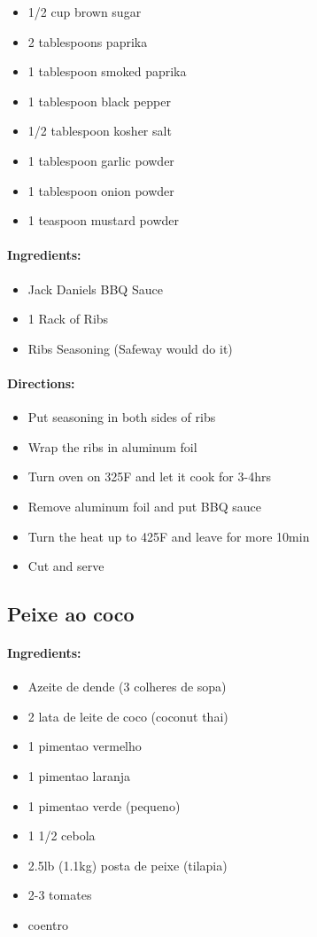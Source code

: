 \documentclass{article}
\begin{document}
\begin{itemize}
\item 1/2 cup brown sugar
\item 2 tablespoons paprika
\item 1 tablespoon smoked paprika
\item 1 tablespoon black pepper
\item 1/2 tablespoon kosher salt
\item 1 tablespoon garlic powder
\item 1 tablespoon onion powder
\item 1 teaspoon mustard powder
\end{itemize}

\paragraph{Ingredients:}

\begin{itemize}
\item Jack Daniels BBQ Sauce 
\item 1 Rack of Ribs 
\item Ribs Seasoning (Safeway would do it)
\end{itemize}

\paragraph{Directions:}
\begin{itemize}
\item Put seasoning in both sides of ribs 
\item Wrap the ribs in aluminum foil 
\item Turn oven on 325F and let it cook for 3-4hrs 
\item Remove aluminum foil and put BBQ sauce 
\item Turn the heat up to 425F and leave for more 10min 
\item Cut and serve
\end{itemize}

\subsection{Peixe ao coco}

\paragraph{Ingredients:}

\begin{itemize}
	\item Azeite de dende (3 colheres de sopa)
	\item 2 lata de leite de coco (coconut thai)
	\item 1 pimentao vermelho
	\item 1 pimentao laranja
	\item 1 pimentao verde (pequeno)
	\item 1 1/2 cebola
	\item 2.5lb (1.1kg) posta de peixe (tilapia)
	\item 2-3 tomates
	\item coentro
\end{itemize}
\end{document}
